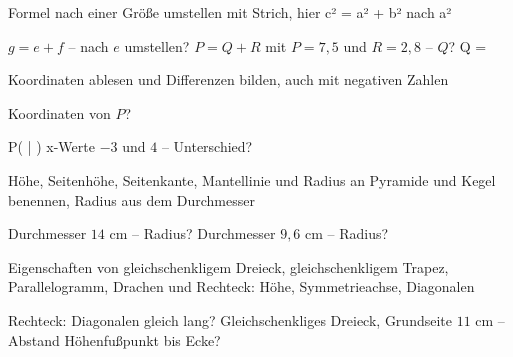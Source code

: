 \begin{aufgabe}{Formel nach einer Größe umstellen mit Strich, hier c² = a² + b² nach a²}
\begin{teile}
\teil $g = e + f$ – nach $e$ umstellen?
\teil $P = Q + R$ mit $P = 7{,}5$ und $R = 2{,}8$ – $Q$? Q = \leerfeld
\end{teile}
\end{aufgabe}

\begin{aufgabe}{Koordinaten ablesen und Differenzen bilden, auch mit negativen Zahlen}
\begin{teile}
\teil Koordinaten von $P$?

\begin{ksys}[xmin=-1,xmax=5,ymin=-1,ymax=5,ablesen]  \end{ksys}
P( \leerfeld | \leerfeld )
\teil x-Werte $-3$ und $4$ – Unterschied? \leerfeld
\end{teile}
\end{aufgabe}

\begin{aufgabe}{Höhe, Seitenhöhe, Seitenkante, Mantellinie und Radius an Pyramide und Kegel benennen, Radius aus dem Durchmesser}
\begin{teile}
\teil Durchmesser $14$ cm – Radius? \leerfeld[cm]
\teil Durchmesser $9{,}6$ cm – Radius? \leerfeld[cm]
\end{teile}
\end{aufgabe}

\begin{aufgabe}{Eigenschaften von gleichschenkligem Dreieck, gleichschenkligem Trapez, Parallelogramm, Drachen und Rechteck: Höhe, Symmetrieachse, Diagonalen}
\begin{teile}
\teil Rechteck: Diagonalen gleich lang? \janein
\teil Gleichschenkliges Dreieck, Grundseite $11$ cm – Abstand Höhenfußpunkt bis Ecke? \leerfeld[cm]
\end{teile}
\end{aufgabe}

